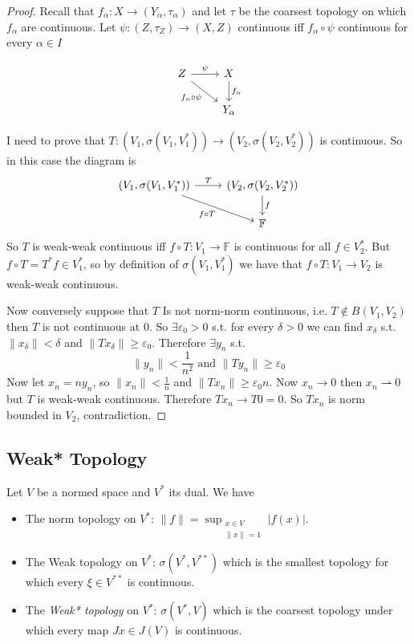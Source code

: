 \documentclass[11pt,a4paper]{article}
\theoremstyle{definition}
\theoremstyle{plain}
\theoremstyle{remark}
\newcommand{\F}{\mathbb{F}}
\newcommand{\abs}[1]{\lvert #1 \rvert}
\newcommand{\norm}[1]{\lVert #1 \rVert}
\newcommand{\1}{\mathbbm{1}}
\newcommand{\wto}{\rightharpoonup}
\begin{document}
\begin{proof}
    Recall that $f_\alpha \colon X \to (Y_\alpha, \tau_\alpha)$ and let $\tau$ be the coarsest topology on which $f_\alpha$ are continuous. 
    Let $\psi \colon (Z, \tau_Z) \to (X, Z)$ continuous iff $f_\alpha \circ \psi$ continuous for every $\alpha \in I$ 
    
    \[
        \begin{tikzcd}
            Z \arrow[r, "\psi"] \arrow[dr, "f_\alpha \circ \psi"'] & X \arrow[d, "f_\alpha"] \\
            & Y_\alpha
        \end{tikzcd}
    \]

    I need to prove that $T \colon (V_1, \sigma(V_1, V_1^*)) \to (V_2, \sigma(V_2, V_2^*))$ is continuous. So in this case the diagram is 
    \[
        \begin{tikzcd}
            (V_1, \sigma(V_1,V_1^*)) \arrow[r, "T"] \arrow[dr, "f \circ T"'] & (V_2, \sigma(V_2,V_2^*)) \arrow[d, "f"] \\
            & \F
        \end{tikzcd}
    \]
    So $T$ is weak-weak continuous iff $f \circ T \colon V_1 \to \F$ is continuous for all $f \in V_2^*$. But $f \circ T = T^* f \in V_1^*$, 
    so by definition of $\sigma(V_1, V_1^*)$ we have that $f \circ T \colon V_1 \to V_2$ is weak-weak continuous.   

    Now conversely suppose that $T$ Is not norm-norm continuous, i.e. $T \not\in B(V_1, V_2)$ then $T$ is not continuous at $0$. So $\exists \varepsilon_0 > 0$ s.t. 
    for every $\delta > 0$ we can find $x_\delta$ s.t. $\norm{x_\delta} < \delta$ and $\norm{Tx_\delta} \ge \varepsilon_0$. 
    Therefore $\exists y_n$ s.t. 
    $$\norm{y_n} < \frac{1}{n^2} \text{ and } \norm{T y_n} \ge \varepsilon_0$$
    Now let $x_n = n y_n$, so $\norm{x_n} < \frac{1}{n}$ and $\norm{Tx_n} \ge \varepsilon_0 n$. Now $x_n \to 0$ then $x_n \wto 0$ but $T$ is weak-weak continuous. 
    Therefore $T x_n \to T0 = 0$. So $Tx_n$ is norm bounded in $V_2$, contradiction. 
\end{proof}

\subsection{Weak* Topology}

Let $V$ be a normed space and $V^*$ its dual. We have
\begin{itemize}
    \item The norm topology on $V^*$: $\norm{f} = \sup_{\substack{x \in V \\ \norm{x} = 1}} \abs{f(x)}$. 
    \item The Weak topology on $V^*$: $\sigma(V^*, V^{**})$ which is the smallest topology for which every $\xi \in V^{**}$ is continuous.
    \item The \emph{Weak* topology} on $V^*$: $\sigma(V^*, V)$ which is the coarsest topology under which every map $Jx \in J(V)$ is continuous.
\end{itemize}
\end{document}
